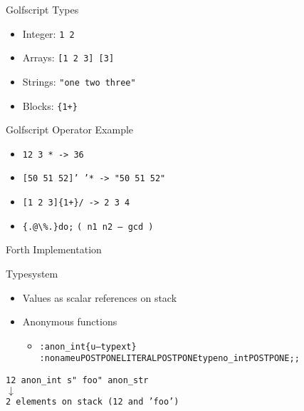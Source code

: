 \documentclass{beamer}
\newcommand{\zwischenueberschrift}[1] { 
    \Huge{#1}
}
\begin{document}
\begin{frame}
    
    \vspace{0.5cm}

    Golfscript Types
    \begin{itemize}
        \item Integer: \texttt{1 2}
        \item Arrays:  \texttt{[1 2 3] [3]}
        \item Strings: \texttt{"one two three"}
        \item Blocks:  \texttt{\{1+\}}
    \end{itemize}

    \vspace{0.5cm}
    \pause 

    Golfscript Operator Example
    \begin{itemize}
        \item \texttt{12 3 * -> 36}
        \item \texttt{[50 51 52]' '* -> "50 51 52"}
        \item \texttt{[1 2 3]\{1+\}/ -> 2 3 4 }
        \item \texttt{\{.@\textbackslash\%.\}do;}  \texttt{( n1 n2 -- gcd )}
    \end{itemize}


\end{frame}


\begin{frame}
\begin{center}
\zwischenueberschrift{Forth Implementation}
\end{center}
\end{frame}


\begin{frame}
    Typesystem
    \begin{itemize}
        \item Values as scalar references on stack
        \item Anonymous functions
          \begin{itemize}
          \item
            \begin{alltt}
              \scriptsize
              : anon\_int \{ u -- typext \} \\
              \quad:noname  u POSTPONE LITERAL POSTPONE typeno\_int  POSTPONE ; ;
            \end{alltt}
     \end{itemize}
    \end{itemize}



    \begin{center}
        \texttt{12 anon\_int s" foo" anon\_str} \\
        $\downarrow$ \\
        \texttt{2 elements on stack (12 and 'foo')}
    \end{center}

\end{frame}
\end{document}
